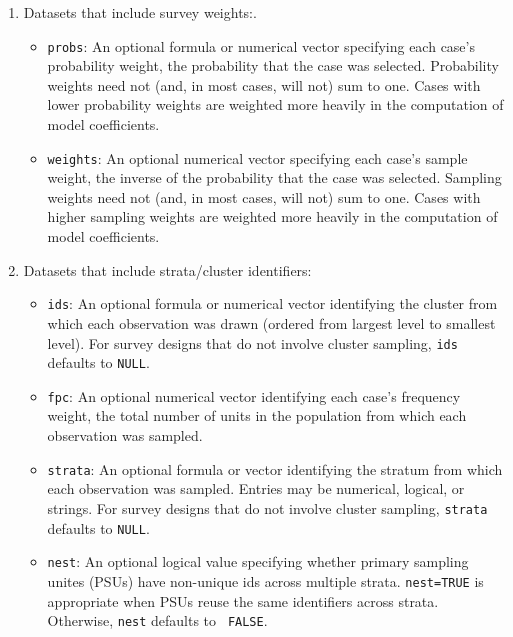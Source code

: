 \begin{enumerate}

\item Datasets that include survey weights:. 

\begin{itemize}  

\item {\tt probs}: An optional formula or numerical vector specifying each 
case's probability weight, the probability that the case was 
selected.  Probability weights need not (and, in most cases, will 
not) sum to one.  Cases with lower probability weights are weighted 
more heavily in the computation of model coefficients.

\item {\tt weights}: An optional numerical vector specifying each 
case's sample weight, the inverse of the probability that the case 
was selected.  Sampling weights need not (and, in most cases, will 
not) sum to one.  Cases with higher sampling weights are weighted 
more heavily in the computation of model coefficients.

\end{itemize}

\item Datasets that include strata/cluster identifiers:

\begin{itemize} 

\item {\tt ids}: An optional formula or numerical vector identifying the 
cluster from which each observation was drawn (ordered from largest level to smallest level).  
For survey designs  that do not involve cluster sampling, {\tt ids} defaults to {\tt NULL}.

\item {\tt fpc}: An optional numerical vector identifying each 
case's frequency weight, the total number of units in the population 
from which each observation was sampled. 

\item {\tt strata}: An optional formula or vector identifying the 
stratum from which each observation was sampled.  Entries may be 
numerical, logical, or strings.  For survey designs that do not 
involve cluster sampling, {\tt strata} defaults to {\tt NULL}. 

\item {\tt nest}: An optional logical value specifying whether 
primary sampling unites (PSUs) have non-unique ids across multiple 
strata.  {\tt nest=TRUE} is appropriate when PSUs reuse the same 
identifiers across strata.  Otherwise, {\tt nest} defaults to {\tt 
FALSE}. 


\end{itemize}
\end{enumerate}
